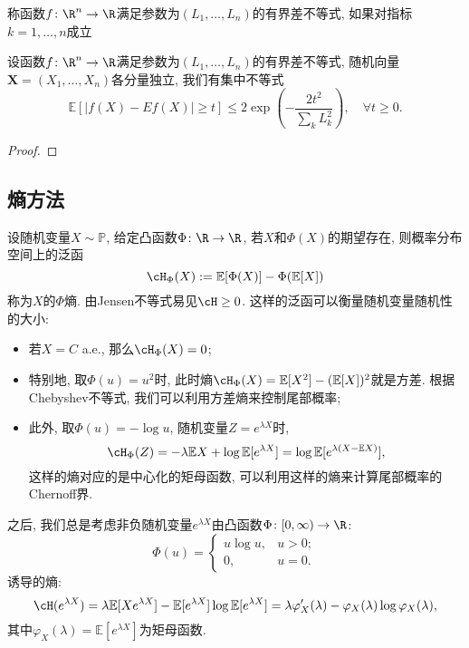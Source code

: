 称函数$f \colon \R^n \to \R$满足参数为$(L_1, \dots, L_n)$的有界差不等式, 如果对指标$k = 1, \dots, n$成立

\begin{corollary}[有界差不等式]
	设函数$f \colon \R^n \to \R$满足参数为$(L_1, \dots, L_n)$的有界差不等式, 随机向量$\bm X = (X_1, \dots, X_n)$各分量独立, 我们有集中不等式
	\begin{equation*}
		\mathbb{E}[|f(X) - E f(X)| \geq t] 
		\leq 2 \exp\left( - \frac{2 t^2}{\sum_k L_k^2} \right), 
		\quad \forall t \geq 0. 
	\end{equation*}
\end{corollary}
\begin{proof}
	
\end{proof}

\subsection{熵方法}
设随机变量$X \sim \mathbb{P}$, 给定凸函数$\Phi \colon \R \to \R$, 若$X$和$\Phi(X)$的期望存在, 则概率分布空间上的泛函
\begin{equation*}
	\cH_\Phi(X) := \mathbb{E}[\Phi(X)] - \Phi(\mathbb{E}[X])  
\end{equation*}
称为$X$的$\Phi$熵.
由Jensen不等式易见$\cH \geq 0$.
这样的泛函可以衡量随机变量随机性的大小: 
\begin{itemize}
	\item 若$X = C$ a.e., 那么$\cH_\Phi (X) = 0$; 
	\item 特别地, 取$\Phi(u) = u^2$时, 此时熵$\cH_\Phi(X) = \mathbb{E}[X^2] - (\mathbb{E}[X])^2$就是方差. 根据Chebyshev不等式, 我们可以利用方差熵来控制尾部概率; 
	\item 此外, 取$\Phi(u) = - \log u$, 随机变量$Z = e^{\lambda X}$时, 
		\begin{equation*}
			\cH_\Phi(Z) 
			= - \lambda \mathbb{E}X + \log \mathbb{E}[e^{\lambda X}] 
			= \log \mathbb{E}[e^{\lambda(X - \mathbb{E}X)}], 
		\end{equation*}
		这样的熵对应的是中心化的矩母函数, 可以利用这样的熵来计算尾部概率的Chernoff界. 
\end{itemize}

之后, 我们总是考虑非负随机变量$e^{\lambda X}$由凸函数$\Phi \colon [0, \infty) \to \R$: 
\begin{equation*}
	\Phi(u) = 
	\begin{cases}
		u \log u, & u > 0; \\ 0, & u = 0. 
	\end{cases}
\end{equation*}
诱导的熵: 
\begin{equation}\label{eq:EntropyByMGF}
	\cH(e^{\lambda X}) 
	= \lambda \mathbb{E}[ X e^{\lambda X}] - \mathbb{E}[e^{\lambda X}] \log \mathbb{E}[e^{\lambda X}]
	= \lambda \varphi_X'(\lambda) - \varphi_X(\lambda) \log \varphi_X(\lambda), 
\end{equation}
其中$\varphi_X(\lambda) = \mathbb{E}[e^{\lambda X}]$为矩母函数. 

